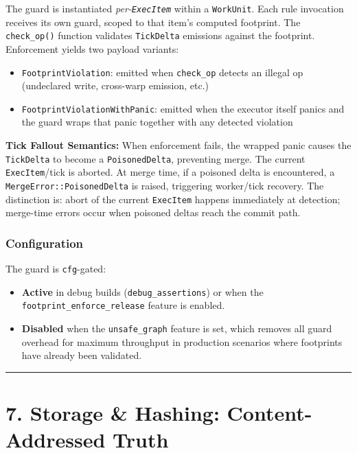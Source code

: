 \documentclass[
]{book}
\begin{document}
The guard is instantiated \emph{per-\texttt{ExecItem}} within a
\texttt{WorkUnit}. Each rule invocation receives its own guard, scoped to
that item's computed footprint. The \texttt{check\_op()} function validates
\texttt{TickDelta} emissions against the footprint. Enforcement yields two
payload variants:
\begin{itemize}
\item \texttt{FootprintViolation}: emitted when \texttt{check\_op} detects an
  illegal op (undeclared write, cross-warp emission, etc.)
\item \texttt{FootprintViolationWithPanic}: emitted when the executor itself
  panics and the guard wraps that panic together with any detected violation
\end{itemize}

\textbf{Tick Fallout Semantics:} When enforcement fails, the wrapped panic
causes the \texttt{TickDelta} to become a \texttt{PoisonedDelta}, preventing
merge. The current \texttt{ExecItem}/tick is aborted. At merge time, if a
poisoned delta is encountered, a \texttt{MergeError::PoisonedDelta} is raised,
triggering worker/tick recovery. The distinction is: abort of the current
\texttt{ExecItem} happens immediately at detection; merge-time errors occur
when poisoned deltas reach the commit path.

\subsubsection{Configuration}\label{guard-configuration}

The guard is \texttt{cfg}-gated:

\begin{itemize}
\item \textbf{Active} in debug builds (\texttt{debug\_assertions}) or when
  the \texttt{footprint\_enforce\_release} feature is enabled.
\item \textbf{Disabled} when the \texttt{unsafe\_graph} feature is set,
  which removes all guard overhead for maximum throughput in production
  scenarios where footprints have already been validated.
\end{itemize}

\begin{center}\rule{0.5\linewidth}{0.5pt}\end{center}

\section{7. Storage \& Hashing: Content-Addressed
Truth}\label{storage-hashing-content-addressed-truth}
\end{document}
